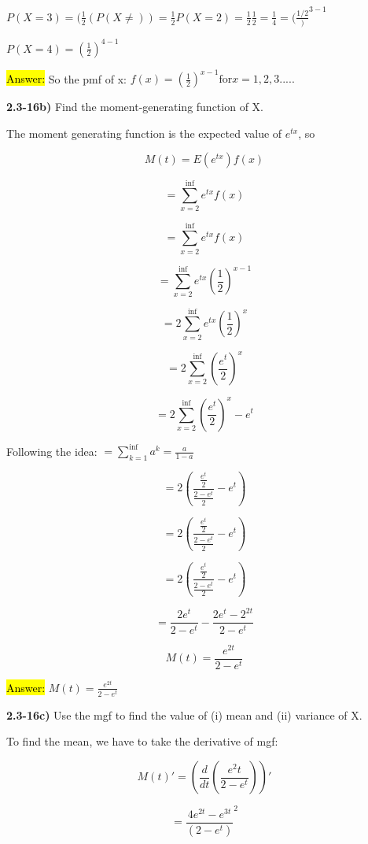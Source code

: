 \documentclass{article}
\begin{document}
$P(X=3)=(\frac{1}{2}(P(X \neq))=\frac{1}{2}P(X=2)=\frac{1}{2}\frac{1}{2}=\frac{1}{4}=(\frac{1/2})^{3-1}$

 \vspace{2mm}
 

$P(X=4) =(\frac{1}{2})^{4-1}$

 \vspace{2mm}
 

\hl{Answer:} So the pmf of x: $f(x) = (\frac{1}{2})^{x-1} \text{for} x=1,2,3.....$


\vspace{5mm}
\textbf{2.3-16b)} Find the moment-generating function of X.

The moment generating function is the expected value of $e^{tx}$, so

$$M(t)=E(e^{tx}) f(x)$$

$$=\sum_{x=2}^{\inf} e^{tx} f(x)$$

$$=\sum_{x=2}^{\inf} e^{tx} f(x)$$

$$=\sum_{x=2}^{\inf} e^{tx} (\frac{1}{2})^{x-1}$$

$$=2 \sum_{x=2}^{\inf} e^{tx} (\frac{1}{2})^{x}$$

$$=2 \sum_{x=2}^{\inf} (\frac{e^{t} }{2})^{x}$$

$$=2 \sum_{x=2}^{\inf} (\frac{e^{t} }{2})^{x}-e^{t}$$

Following the idea: $= \sum_{k=1}^{\inf} a^{k}=\frac{a}{1-a}$

$$=2 (\frac{\frac{e^{t}}{2}}{\frac{2-e^{t}}{2}}-e^{t})$$

$$=2 (\frac{\frac{e^{t}}{2}}{\frac{2-e^{t}}{2}}-e^{t})$$

$$=2 (\frac{\frac{e^{t}}{2}}{\frac{2-e^{t}}{2}}-e^{t})$$

$$=\frac{2e^{t}}{2-e^{t}}-\frac{2e^{t}-2^{2t}}{2-e^{t}}$$

$$M(t)=\frac{e^{2t}}{2-e^{t}}$$

\hl{Answer:} $M(t)=\frac{e^{2t}}{2-e^{t}}$

 
 \vspace{5mm}


\textbf{2.3-16c)} Use the mgf to find the value of (i) mean and (ii) variance of X.

To find the mean, we have to take the derivative of mgf: 

$$M(t)'= (\frac{d}{dt}(\frac{e^2{t}}{2-e^{t}}))'$$

$$= \frac{4e^{2t}-e^{3t}}{(2-e^{t})}^{2}$$
\end{document}
